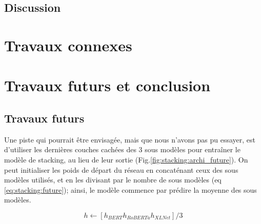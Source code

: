\documentclass[11pt,a4paper, french]{article}
\begin{document}
\subsection{Discussion}


\section{Travaux connexes}



\section{Travaux futurs et conclusion }

\subsection{Travaux futurs}

Une piste qui pourrait être envisagée, mais que nous n'avons pas pu essayer, est d'utiliser les dernières couches cachées des 3 sous modèles pour entraîner le modèle de stacking, au lieu de leur sortie (Fig.\ref{fig:stacking:archi_future}). On peut initialiser les poids de départ du réseau en concaténant ceux des sous modèles utilisés, et en les divisant par le nombre de sous modèles (eq \ref{eq:stacking:future}); ainsi, le modèle commence par prédire la moyenne des sous modèles.

\begin{equation}
  h \leftarrow [h_{BERT} h_{RoBERTa} h_{XLNet}] / 3 \label{eq:stacking:future}
\end{equation}
\end{document}
